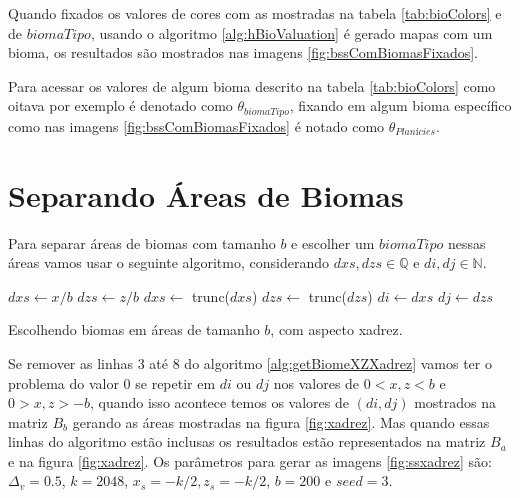 Quando fixados os valores de cores com as mostradas
na tabela \ref{tab:bioColors} e de $biomaTipo$, usando o
algoritmo \ref{alg:hBioValuation} é gerado mapas com um bioma,
os resultados são mostrados nas imagens \ref{fig:bssComBiomasFixados}.

Para acessar os valores de algum bioma descrito na tabela \ref{tab:bioColors} como oitava por exemplo
é denotado como $\theta_{biomaTipo}$, fixando em algum bioma específico como nas imagens \ref{fig:bssComBiomasFixados}
é notado como $\theta_{Planícies}$.

\section{Separando Áreas de Biomas}
Para separar áreas de biomas com tamanho $b$ e escolher um $biomaTipo$ nessas áreas
vamos usar o seguinte algoritmo, considerando $dxs, dzs \in \mathbb{Q}$ e $di, dj \in \mathbb{N}$.

\begin{algorithm}[H]\label{alg:getBiomeXZXadrez}
    $dxs \leftarrow x/b$\;
    $dzs \leftarrow z/b$\;
    $dxs \leftarrow$ trunc($dxs$)\;
    $dzs \leftarrow$ trunc($dzs$)\;
    $di \leftarrow dxs$\;
    $dj \leftarrow dzs$\;
    
    
    \caption{Escolhendo biomas em áreas de tamanho $b$, com aspecto xadrez.}
\end{algorithm}

Se remover as linhas 3 até 8 do algoritmo \ref{alg:getBiomeXZXadrez} vamos ter o 
problema do valor $0$ se repetir em $di$ ou $dj$ nos valores de $0 < x, z < b$ e $0 > x, z > -b$, 
quando isso acontece temos os valores de $(di, dj)$ mostrados na
matriz $B_{b}$ gerando as áreas mostradas na figura \ref{fig:xadrez}. Mas quando essas
linhas do algoritmo estão inclusas os resultados estão representados na matriz $B_{a}$
e na figura \ref{fig:xadrez}. Os parâmetros para gerar as
imagens \ref{fig:ssxadrez} são: $\Delta_{v} = 0.5$, 
$k = 2048$, $ x_{s} = -k/2 , z_{s} = -k/2$, $b = 200$ e $seed = 3$.


